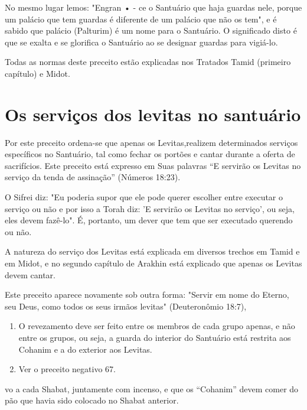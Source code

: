 No mesmo lugar lemos: "Engran • - ce o Santuário que haja guardas nele,
porque um palácio que tem guardas é diferente de um palácio que não os
tem", e é sabido que palácio (Palturim) é um nome para o Santuário. O
signi­ficado disto é que se exalta e se glorifica o Santuário ao se
designar guardas pa­ra vigiá-lo.

Todas as normas deste preceito estão explicadas nos Tratados Ta­mid
(primeiro capítulo) e Midot.

\section{Os serviços dos levitas no santuário}

Por este preceito ordena-se que apenas os Levitas,realizem determi­nados
serviços específicos no Santuário, tal como fechar os portões e cantar
durante a oferta de sacrifícios. Este preceito está expresso em Suas
palavras ``E servirão os Levitas no serviço da tenda de assinação''
(Números 18:23).

O Sifrei diz: "Eu poderia supor que ele pode querer escolher entre
executar o serviço ou não e por isso a Torah diz: 'E servirão os Levitas
no servi­ço', ou seja, eles devem fazê-lo". É, portanto, um dever que
tem que ser execu­tado querendo ou não.

A natureza do serviço dos Levitas está explicada em diversos trechos em
Tamid e em Midot, e no segundo capítulo de Arakhin está explicado que
apenas os Levitas devem cantar.

Este preceito aparece novamente sob outra forma: "Servir em nome do
Eterno, seu Deus, como todos os seus irmãos levitas" (Deuteronômio
18:7),


\begin{enumerate}
\def\labelenumi{\arabic{enumi}.}
\setcounter{enumi}{47}
\item
 
 O revezamento deve ser feito entre os membros de cada grupo apenas, e
 não entre os grupos, ou seja, a guarda do interior do Santuário está
 restrita aos Cohanim e a do exterior aos Levitas.
 
\item
 
 Ver o preceito negativo 67.
 
\end{enumerate}




vo a cada Shabat, juntamente com incenso, e que os ``Cohanim'' devem comer
do pão que havia sido colocado no Shabat anterior.

